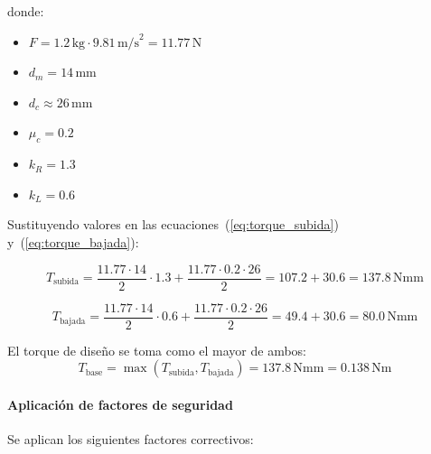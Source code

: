 donde:
\begin{itemize}
    \item $F = 1.2\,\text{kg} \cdot 9.81\,\text{m/s}^2 = 11.77$\,N
    \item $d_m = 14$\,mm 
    \item $d_c \approx 26$\,mm
    \item $\mu_c = 0.2$ 
    \item $k_R = 1.3$ 
    \item $k_L = 0.6$ 
\end{itemize}

Sustituyendo valores en las ecuaciones~(\ref{eq:torque_subida}) y~(\ref{eq:torque_bajada}):

\[T_{\text{subida}} = \frac{11.77 \cdot 14}{2} \cdot 1.3 + \frac{11.77 \cdot 0.2 \cdot 26}{2} = 107.2 + 30.6 = 137.8\,\text{Nmm}\]

\[T_{\text{bajada}} = \frac{11.77 \cdot 14}{2} \cdot 0.6 + \frac{11.77 \cdot 0.2 \cdot 26}{2} = 49.4 + 30.6 = 80.0\,\text{Nmm}\]

El torque de diseño se toma como el mayor de ambos:
\[T_{\text{base}} = \max(T_{\text{subida}}, T_{\text{bajada}}) = 137.8\,\text{Nmm} = 0.138\,\text{Nm}\]

\paragraph{Aplicación de factores de seguridad}
Se aplican los siguientes factores correctivos:

